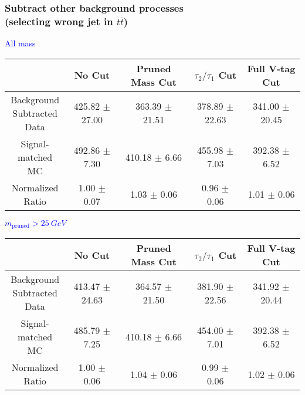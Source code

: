 \documentclass{beamer}
\begin{document}
\begin{frame}
  \frametitle{Subtract other background processes \\ (selecting wrong jet in $t\bar{t}$)}
  \begin{adjustwidth}{-1.5em}{-1.5em}
    \centering
    \vspace{6pt}
    \textcolor{blue}{All mass}
    \vspace{6pt}

    {\scriptsize
      \begin{tabular}{c | c | c | c | c}
        \hline
        & No Cut & Pruned Mass Cut & $\tau_2/\tau_1$ Cut & Full V-tag Cut \\
        \hline
        \makecell{Background \\ Subtracted \\ Data} & 425.82 $\pm$ 27.00 & 363.39 $\pm$ 21.51 & 378.89 $\pm$ 22.63 & 341.00 $\pm$ 20.45 \\
        \makecell{Signal-\\ matched MC} & 492.86 $\pm$ 7.30 & 410.18 $\pm$ 6.66 & 455.98 $\pm$ 7.03 & 392.38 $\pm$ 6.52 \\
        \hline
        \makecell{Normalized \\ Ratio} & 1.00 $\pm$ 0.07 & 1.03 $\pm$ 0.06 & 0.96 $\pm$ 0.06 & 1.01 $\pm$ 0.06 \\
        \hline
      \end{tabular}
    }

    \vspace{6pt}
    \textcolor{blue}{$m_\text{pruned} > \SI{25}{GeV}$}
    \vspace{6pt}

    {\scriptsize
      \begin{tabular}{c | c | c | c | c}
        \hline
        & No Cut & Pruned Mass Cut & $\tau_2/\tau_1$ Cut & Full V-tag Cut \\
        \hline
        \makecell{Background \\ Subtracted \\ Data} & 413.47 $\pm$ 24.63 & 364.57 $\pm$ 21.50 & 381.90 $\pm$ 22.56 & 341.92 $\pm$ 20.44 \\
        \makecell{Signal-\\ matched MC} & 485.79 $\pm$ 7.25 & 410.18 $\pm$ 6.66 & 454.00 $\pm$ 7.01 & 392.38 $\pm$ 6.52 \\
        \hline
        \makecell{Normalized \\ Ratio} & 1.00 $\pm$ 0.06 & 1.04 $\pm$ 0.06 & 0.99 $\pm$ 0.06 & 1.02 $\pm$ 0.06 \\
        \hline
      \end{tabular}
    }
  \end{adjustwidth}
\end{frame}
\end{document}
